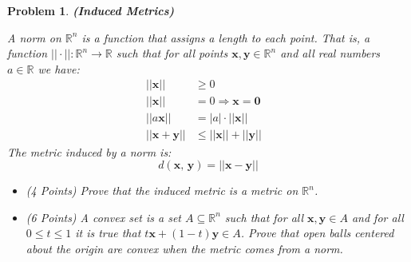 \documentclass{article}
\theoremstyle{normal}
\newtheorem{problem}{Problem}
\begin{document}
    \begin{problem}
        \textbf{(Induced Metrics)}
        \par\hfill\par
        A \textit{norm} on $\mathbb{R}^{n}$ is a function that assigns a
        \textit{length} to each point. That is, a function
        $||\cdot||:\mathbb{R}^{n}\rightarrow\mathbb{R}$ such that for all
        points $\mathbf{x},\mathbf{y}\in\mathbb{R}^{n}$ and all real numbers
        $a\in\mathbb{R}$ we have:
        \begin{align}
            ||\mathbf{x}||&\geq{0}&\tag{Positivity}\\
            ||\mathbf{x}||&=0
                \Rightarrow\mathbf{x}=\mathbf{0}\tag{Definiteness}\\
            ||a\mathbf{x}||&=|a|\cdot||\mathbf{x}||
                \tag{Homogeneity}\\
            ||\mathbf{x}+\mathbf{y}||&\leq||\mathbf{x}||+||\mathbf{y}||
                \tag{Triangle-Inequality}
        \end{align}
        The metric induced by a norm is:
        \begin{equation}
            d(\mathbf{x},\,\mathbf{y})=||\mathbf{x}-\mathbf{y}||
        \end{equation}
        \begin{itemize}
            \item (4 Points) Prove that the induced metric is a metric on
                $\mathbb{R}^{n}$.
            \item (6 Points) A convex set is a set $A\subseteq\mathbb{R}^{n}$
                such that for all $\mathbf{x},\mathbf{y}\in{A}$ and for all
                $0\leq{t}\leq{1}$ it is true that
                $t\mathbf{x}+(1-t)\mathbf{y}\in{A}$. Prove that open balls
                centered about the origin are convex when the metric comes from
                a norm.
        \end{itemize}
    \end{problem}
    \color{black}
\end{document}
